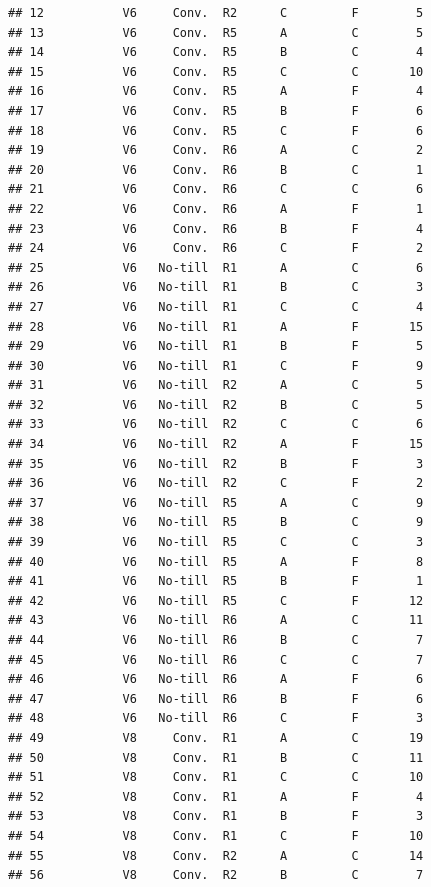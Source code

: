 \documentclass[
]{article}
\begin{document}
\begin{verbatim}
## 12           V6     Conv.  R2      C         F        5
## 13           V6     Conv.  R5      A         C        5
## 14           V6     Conv.  R5      B         C        4
## 15           V6     Conv.  R5      C         C       10
## 16           V6     Conv.  R5      A         F        4
## 17           V6     Conv.  R5      B         F        6
## 18           V6     Conv.  R5      C         F        6
## 19           V6     Conv.  R6      A         C        2
## 20           V6     Conv.  R6      B         C        1
## 21           V6     Conv.  R6      C         C        6
## 22           V6     Conv.  R6      A         F        1
## 23           V6     Conv.  R6      B         F        4
## 24           V6     Conv.  R6      C         F        2
## 25           V6   No-till  R1      A         C        6
## 26           V6   No-till  R1      B         C        3
## 27           V6   No-till  R1      C         C        4
## 28           V6   No-till  R1      A         F       15
## 29           V6   No-till  R1      B         F        5
## 30           V6   No-till  R1      C         F        9
## 31           V6   No-till  R2      A         C        5
## 32           V6   No-till  R2      B         C        5
## 33           V6   No-till  R2      C         C        6
## 34           V6   No-till  R2      A         F       15
## 35           V6   No-till  R2      B         F        3
## 36           V6   No-till  R2      C         F        2
## 37           V6   No-till  R5      A         C        9
## 38           V6   No-till  R5      B         C        9
## 39           V6   No-till  R5      C         C        3
## 40           V6   No-till  R5      A         F        8
## 41           V6   No-till  R5      B         F        1
## 42           V6   No-till  R5      C         F       12
## 43           V6   No-till  R6      A         C       11
## 44           V6   No-till  R6      B         C        7
## 45           V6   No-till  R6      C         C        7
## 46           V6   No-till  R6      A         F        6
## 47           V6   No-till  R6      B         F        6
## 48           V6   No-till  R6      C         F        3
## 49           V8     Conv.  R1      A         C       19
## 50           V8     Conv.  R1      B         C       11
## 51           V8     Conv.  R1      C         C       10
## 52           V8     Conv.  R1      A         F        4
## 53           V8     Conv.  R1      B         F        3
## 54           V8     Conv.  R1      C         F       10
## 55           V8     Conv.  R2      A         C       14
## 56           V8     Conv.  R2      B         C        7

\end{verbatim}
\end{document}
